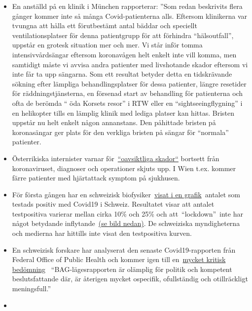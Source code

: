 \begin{itemize}
  (befolkningsrelaterad) på 0,06\%, vilket motsvarar en stark
  säsongsinfluensa.
\item
  En anställd på en klinik i München rapporterar: ''Som redan beskrivits
  flera gånger kommer inte så många Covid-patienterna alls. Eftersom
  klinikerna var tvungna att hålla ett förutbestämt antal bäddar och
  speciellt ventilationsplatser för denna patientgrupp för att förhindra
  ``hälsoutfall'', uppstår en grotesk situation mer och mer. Vi står
  inför tomma intensivvårdsängar eftersom koronavågen helt enkelt inte
  vill komma, men samtidigt måste vi avvisa andra patienter med
  livshotande skador eftersom vi inte får ta upp sängarna. Som ett
  resultat betyder detta en tidskrävande sökning efter lämpliga
  behandlingsplatser för dessa patienter, längre resetider för
  räddningstjänsterna, en försenad start av behandling för patienterna
  och ofta de berömda `` öda Korsets resor'' i RTW eller en
  ``sightseeingflygning'' i en helikopter tills en lämplig klinik med
  lediga platser kan hittas. Bristen uppstår nu helt enkelt någon
  annanstans. Den påhittade bristen på koronasängar ger plats för den
  verkliga bristen på sängar för ``normala'' patienter.
\item
  Österrikiska internister varnar
  för~\href{https://wien.orf.at/stories/3044064}{``oavsiktliga skador``}
  bortsett från koronaviruset, diagnoser och operationer skjuts upp. I
  Wien t.ex. kommer färre patienter med hjärtattack symptom på
  sjukhusen.
\item
  För första gången har en schweizisk
  biofysiker~\href{https://swprs.org/rate-of-positive-covid19-tests/}{visat
  i en grafik}~antalet som testads positiv med Covid19 i Schweiz.
  Resultatet visar att antalet testpositiva varierar mellan cirka 10\%
  och 25\% och att~``lockdown''~inte har något betydande
  inflytande~\href{https://web.archive.org/web/20200415204500/https://mobile.twitter.com/FScholkmann/status/1249703752904425478}{(se
  bild nedan)}. De schweiziska myndigheterna och medierna har hittills
  inte visat den testpositiva kurven.
\item
  En schweizisk forskare har analyserat den senaste Covid19-rapporten
  från Federal Office of Public Health och kommer igen till
  en~\href{https://covid-19-fakten.blogspot.com/2020/04/der-bag-situationsbericht-vom-1442020.html}{mycket
  kritisk bedömning}~ ``BAG-lägesrapporten är olämplig för politik och
  kompetent beslutsfattande där, är återigen mycket ospecifik,
  ofullständig och otillräckligt meningsfull.''
\item

\end{itemize}
